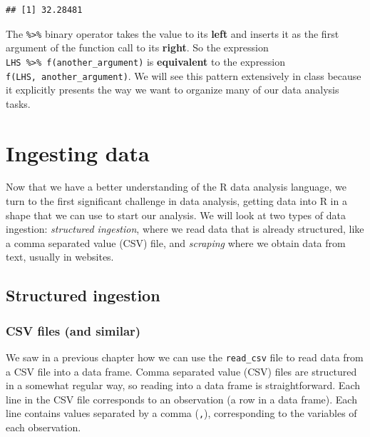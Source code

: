 \documentclass[]{article}
\newenvironment{Shaded}{\begin{snugshade}}{\end{snugshade}}
\newcommand{\KeywordTok}[1]{\textcolor[rgb]{0.13,0.29,0.53}{\textbf{{#1}}}}
\newcommand{\DataTypeTok}[1]{\textcolor[rgb]{0.13,0.29,0.53}{{#1}}}
\newcommand{\StringTok}[1]{\textcolor[rgb]{0.31,0.60,0.02}{{#1}}}
\newcommand{\OtherTok}[1]{\textcolor[rgb]{0.56,0.35,0.01}{{#1}}}
\newcommand{\NormalTok}[1]{{#1}}
\theoremstyle{definition}
\theoremstyle{definition}
\theoremstyle{remark}
\begin{document}
\begin{Shaded}
\end{Shaded}

\begin{verbatim}
## [1] 32.28481
\end{verbatim}

The \texttt{\%\textgreater{}\%} binary operator takes the value to its
\textbf{left} and inserts it as the first argument of the function call
to its \textbf{right}. So the expression
\texttt{LHS\ \%\textgreater{}\%\ f(another\_argument)} is
\textbf{equivalent} to the expression
\texttt{f(LHS,\ another\_argument)}. We will see this pattern
extensively in class because it explicitly presents the way we want to
organize many of our data analysis tasks.

\section{Ingesting data}\label{ingesting-data}

Now that we have a better understanding of the R data analysis language,
we turn to the first significant challenge in data analysis, getting
data into R in a shape that we can use to start our analysis. We will
look at two types of data ingestion: \emph{structured ingestion}, where
we read data that is already structured, like a comma separated value
(CSV) file, and \emph{scraping} where we obtain data from text, usually
in websites.

\subsection{Structured ingestion}\label{structured-ingestion}

\subsubsection{CSV files (and similar)}\label{csv-files-and-similar}

We saw in a previous chapter how we can use the \texttt{read\_csv} file
to read data from a CSV file into a data frame. Comma separated value
(CSV) files are structured in a somewhat regular way, so reading into a
data frame is straightforward. Each line in the CSV file corresponds to
an observation (a row in a data frame). Each line contains values
separated by a comma (\texttt{,}), corresponding to the variables of
each observation.
\end{document}
